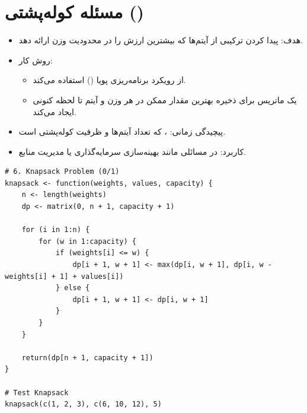 \documentclass[11pt, a4paper, oneside]{book}
\begin{document}
			
		\section{مسئله کوله‌پشتی ()}
			
			
			\begin{itemize}
				
				\item {\large هدف}:
				پیدا کردن ترکیبی از آیتم‌ها که بیشترین ارزش را در محدودیت وزن ارائه دهد.
				
				\item {\large روش کار}: \par
				
				\begin{itemize}
					
					\item از رویکرد برنامه‌ریزی پویا () استفاده می‌کند.
					
					\item یک ماتریس برای ذخیره بهترین مقدار ممکن در هر وزن و آیتم تا لحظه کنونی ایجاد می‌کند.
					
				\end{itemize}
				
				\item {\large پیچیدگی زمانی}:
				، که 
				تعداد آیتم‌ها و 
				ظرفیت کوله‌پشتی است.
				
				\item {\large کاربرد}:
				در مسائلی مانند بهینه‌سازی سرمایه‌گذاری یا مدیریت منابع.
				
			\end{itemize}
			
			\begin{latin}
				\begin{lstlisting}[caption={\lr{0/1 Knapsack Problem}}] 
# 6. Knapsack Problem (0/1)
knapsack <- function(weights, values, capacity) {
	n <- length(weights)
	dp <- matrix(0, n + 1, capacity + 1)
	
	for (i in 1:n) {
		for (w in 1:capacity) {
			if (weights[i] <= w) {
				dp[i + 1, w + 1] <- max(dp[i, w + 1], dp[i, w - weights[i] + 1] + values[i])
			} else {
				dp[i + 1, w + 1] <- dp[i, w + 1]
			}
		}
	}
	
	return(dp[n + 1, capacity + 1])
}

# Test Knapsack
knapsack(c(1, 2, 3), c(6, 10, 12), 5)

				\end{lstlisting}
			\end{latin}
			
\end{document}
